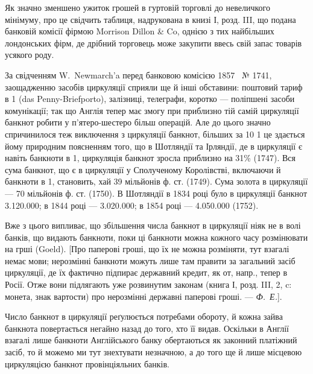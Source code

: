 
Як значно зменшено ужиток грошей в гуртовій торговлі до невеличкого
мінімуму, про це свідчить таблиця, надрукована в книзі І, розд. III,
що подана банковій комісії фірмою Morrison Dillon \& Co, однією з тих найбільших
лондонських фірм, де дрібний торговець може закупити ввесь свій запас
товарів усякого роду.

За свідченням W.~Newmarch’a перед банковою комісією 1857~ № 1741,
заощадженню засобів циркуляції сприяли ще й інші обставини: поштовий тариф
в 1 (das Penny-Briefporto), залізниці, телеграфи, коротко — поліпшені засоби
комунікації; так що Англія тепер має змогу при приблизно тій самій циркуляції
банкнот робити у п’ятеро-шестеро більш операцій. Але до цього значно
спричинилося теж виключення з циркуляції банкнот, більших за 10 1 це
здається йому природним поясненням того, що в Шотляндії та Ірляндії, де в
циркуляції є навіть банкноти в 1, циркуляція банкнот зросла приблизно
на 31\% (1747). Вся сума банкнот, що є в циркуляції у Сполученому Королівстві,
включаючи й банкноти в 1, становить, хай 39 мільйонів ф. ст.
(1749). Сума золота в циркуляції — 70 мільйонів ф. ст. (1750). В Шотляндії
в 1834 році було в циркуляції банкнот \num{3.120.000}; в 1844 році —
\num{3.020.000}; в 1854 році — \num{4.050.000} (1752).

Вже з цього випливає, що збільшення числа банкнот в циркуляції ніяк
не в волі банків, що видають банкноти, поки ці банкноти можна кожного часу
розмінювати на грші (Goeld). [Про паперові гроші, що їх не можна розміняти,
тут взагалі немає мови; нерозмінні банкноти можуть лише там правити за загальний
засіб циркуляції, де їх фактично підпирає державний кредит, як от, напр., тепер
в Росії. Отже вони підлягають уже розвинутим законам (книга І, розд. III, 2, c:
монета, знак вартости) про нерозмінні державні паперові гроші. — \emph{Ф.~Е.}].

Число банкнот в циркуляції реґулюється потребами обороту, й кожна
зайва банкнота повертається негайно назад до того, хто її видав. Оскільки в
Англії взагалі лише банкноти Англійського банку обертаються як законний
платіжний засіб, то й можемо ми тут знехтувати незначною, а до того ще й лише
місцевою циркуляцією банкнот провінціяльних банків.
